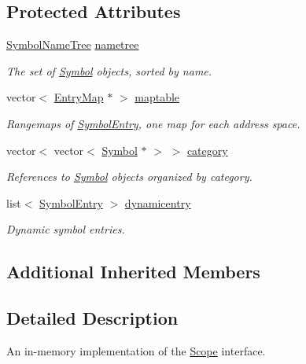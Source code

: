 \subsection*{Protected Attributes}
\begin{DoxyCompactItemize}
\item 
\mbox{\hyperlink{database_8hh_a6ed1db9b39a7f86a7a00b392bbe3f0d1}{Symbol\+Name\+Tree}} \mbox{\hyperlink{class_scope_internal_ad4084595095b578e1c8fd25301ffb02d}{nametree}}
\begin{DoxyCompactList}\small\item\em The set of \mbox{\hyperlink{class_symbol}{Symbol}} objects, sorted by name. \end{DoxyCompactList}\item 
vector$<$ \mbox{\hyperlink{database_8hh_a44a8ea0c0009b316b2651d374e5d4260}{Entry\+Map}} $\ast$ $>$ \mbox{\hyperlink{class_scope_internal_ab5658fe9f8073010df73298690099872}{maptable}}
\begin{DoxyCompactList}\small\item\em Rangemaps of \mbox{\hyperlink{class_symbol_entry}{Symbol\+Entry}}, one map for each address space. \end{DoxyCompactList}\item 
vector$<$ vector$<$ \mbox{\hyperlink{class_symbol}{Symbol}} $\ast$ $>$ $>$ \mbox{\hyperlink{class_scope_internal_a52896f135c4c695914fba0e28d198308}{category}}
\begin{DoxyCompactList}\small\item\em References to \mbox{\hyperlink{class_symbol}{Symbol}} objects organized by category. \end{DoxyCompactList}\item 
list$<$ \mbox{\hyperlink{class_symbol_entry}{Symbol\+Entry}} $>$ \mbox{\hyperlink{class_scope_internal_a74bb56d748daae518b88b73d8f687d75}{dynamicentry}}
\begin{DoxyCompactList}\small\item\em Dynamic symbol entries. \end{DoxyCompactList}\end{DoxyCompactItemize}
\subsection*{Additional Inherited Members}


\subsection{Detailed Description}
An in-\/memory implementation of the \mbox{\hyperlink{class_scope}{Scope}} interface. 

